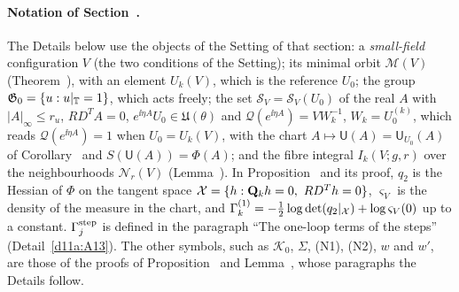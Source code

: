 \paragraph{Notation of Section~.} The Details below use the objects of the Setting of that section: a \emph{small-field} configuration $V$ (the two conditions of the Setting); its minimal orbit $\mathscr M(V)$ (Theorem~), with an element $U_k(V)$, which is the reference $U_0$; the group $\mathfrak G_0=\{u:u|_\mathbb T=1\}$, which acts freely; the set $\mathcal S_V=\mathcal S_V(U_0)$ of the real $A$ with $|A|_\infty\le r_u$, $RD^TA=0$, $e^{\ii\eta A}U_0\in\mathfrak U(\theta)$ and $\mathcal Q(e^{\ii\eta A})=VW_k^{-1}$, $W_k=U_0^{(k)}$, which reads $\mathcal Q(e^{\ii\eta A})=1$ when $U_0=U_k(V)$, with the chart $A\mapsto\mathsf U(A)=\mathsf U_{U_0}(A)$ of Corollary~ and $S(\mathsf U(A))=\Phi(A)$; and the fibre integral $I_k(V;g,r)$ over the neighbourhoods $\mathscr N_r(V)$ (Lemma~). In Proposition~ and its proof, $q_2$ is the Hessian of $\Phi$ on the tangent space $\cX=\{h:\bQ_kh=0,\ RD^Th=0\}$, $\varsigma_V$ is the density of the measure in the chart, and $\Gamma^{(1)}_k=-\frac12\log\det(q_2|_\mathcal X)+\log\varsigma_V(0)$ up to a constant. $\Gamma^{\rm step}_j$ is defined in the paragraph ``The one-loop terms of the steps'' (Detail~\ref{d11a:A13}). The other symbols, such as $\mathcal K_0$, $\Sigma$, (N1), (N2), $w$ and $w'$, are those of the proofs of Proposition~ and Lemma~, whose paragraphs the Details follow.


